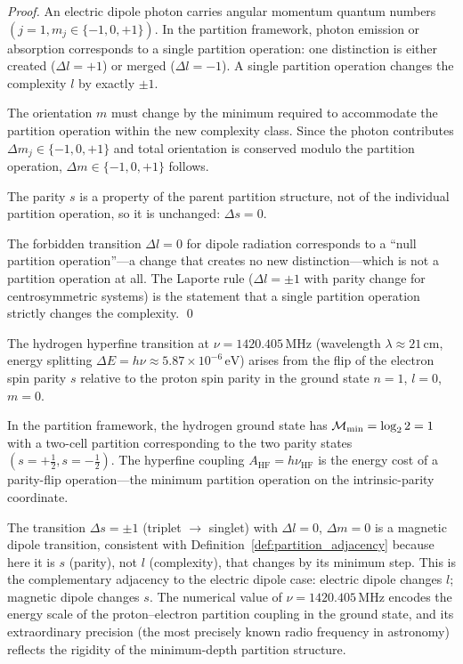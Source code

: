 \begin{proof}
An electric dipole photon carries angular momentum quantum numbers
$(j=1, m_j \in \{-1, 0, +1\})$. In the partition framework, photon emission
or absorption corresponds to a single partition operation: one distinction is
either created ($\Delta l = +1$) or merged ($\Delta l = -1$). A single
partition operation changes the complexity $l$ by exactly $\pm 1$.

The orientation $m$ must change by the minimum required to accommodate the
partition operation within the new complexity class. Since the photon contributes
$\Delta m_j \in \{-1, 0, +1\}$ and total orientation is conserved modulo the
partition operation, $\Delta m \in \{-1, 0, +1\}$ follows.

The parity $s$ is a property of the parent partition structure, not of the
individual partition operation, so it is unchanged: $\Delta s = 0$.

The forbidden transition $\Delta l = 0$ for dipole radiation corresponds to
a ``null partition operation''---a change that creates no new distinction---which
is not a partition operation at all. The Laporte rule ($\Delta l = \pm 1$ with
parity change for centrosymmetric systems) is the statement that a single
partition operation strictly changes the complexity. \qed
\end{proof}

\begin{example}
\label{ex:21cm}
The hydrogen hyperfine transition at $\nu = 1420.405\,\mathrm{MHz}$
(wavelength $\lambda \approx 21\,\mathrm{cm}$, energy splitting
$\Delta E = h\nu \approx 5.87 \times 10^{-6}\,\mathrm{eV}$) arises from
the flip of the electron spin parity $s$ relative to the proton spin parity
in the ground state $n = 1$, $l = 0$, $m = 0$.

In the partition framework, the hydrogen ground state has $\mathcal{M}_{\min} = \log_2 2 = 1$
with a two-cell partition corresponding to the two parity states
$(s = +\tfrac{1}{2}, s = -\tfrac{1}{2})$. The hyperfine coupling
$A_{\mathrm{HF}} = h\nu_{\mathrm{HF}}$ is the energy cost of a parity-flip
operation---the minimum partition operation on the intrinsic-parity coordinate.

The transition $\Delta s = \pm 1$ (triplet $\to$ singlet) with $\Delta l = 0$,
$\Delta m = 0$ is a magnetic dipole transition, consistent with
Definition~\ref{def:partition_adjacency} because here it is $s$ (parity),
not $l$ (complexity), that changes by its minimum step. This is the
complementary adjacency to the electric dipole case: electric dipole changes
$l$; magnetic dipole changes $s$. The numerical value of $\nu = 1420.405\,\mathrm{MHz}$
encodes the energy scale of the proton--electron partition coupling in the
ground state, and its extraordinary precision (the most precisely known
radio frequency in astronomy) reflects the rigidity of the minimum-depth
partition structure.
\end{example}

